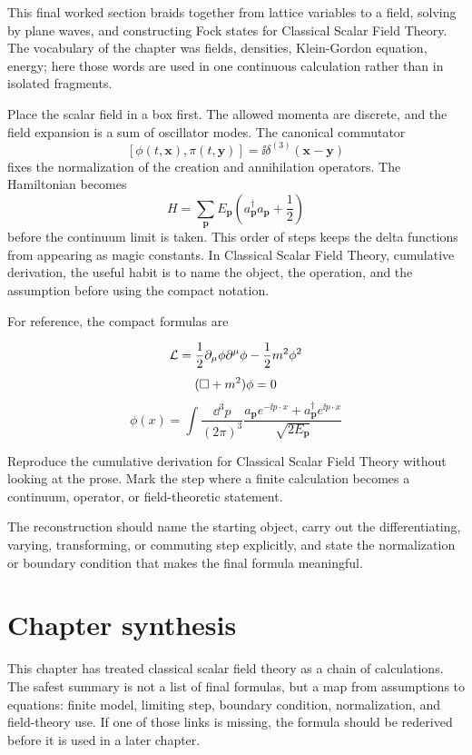 This final worked section braids together from lattice variables to a field, solving by plane waves, and constructing Fock states for Classical Scalar Field Theory.  The vocabulary of the chapter was fields, densities, Klein-Gordon equation, energy; here those words are used in one continuous calculation rather than in isolated fragments.

Place the scalar field in a box first.  The allowed momenta are discrete, and the field expansion is a sum of oscillator modes.  The canonical commutator
\[
  [\phi(t,\bm x),\pi(t,\bm y)]=\ii\delta^{(3)}(\bm x-\bm y)
\]
fixes the normalization of the creation and annihilation operators.  The Hamiltonian becomes
\[
  H=\sum_{\bm p}E_{\bm p}\left(a_{\bm p}^\dagger a_{\bm p}+\frac12\right)
\]
before the continuum limit is taken.  This order of steps keeps the delta functions from appearing as magic constants.  In Classical Scalar Field Theory, cumulative derivation, the useful habit is to name the object, the operation, and the assumption before using the compact notation.

For reference, the compact formulas are

\[
  \mathcal L=\frac12\partial_\mu\phi\partial^\mu\phi-\frac12m^2\phi^2
\]
\[
  (\Box+m^2)\phi=0
\]
\[
  \phi(x)=\int\frac{\dd^3p}{(2\pi)^3}\frac{a_{\bm p}e^{-\ii p\cdot x}+a_{\bm p}^\dagger e^{\ii p\cdot x}}{\sqrt{2E_{\bm p}}}
\]

\begin{exercise}
Reproduce the cumulative derivation for Classical Scalar Field Theory without looking at the prose.  Mark the step where a finite calculation becomes a continuum, operator, or field-theoretic statement.
\begin{answer}
The reconstruction should name the starting object, carry out the differentiating, varying, transforming, or commuting step explicitly, and state the normalization or boundary condition that makes the final formula meaningful.
\end{answer}
\end{exercise}



\section{Chapter synthesis}

This chapter has treated classical scalar field theory as a chain of calculations.  The safest summary is not a list of final formulas, but a map from assumptions to equations: finite model, limiting step, boundary condition, normalization, and field-theory use.  If one of those links is missing, the formula should be rederived before it is used in a later chapter.

